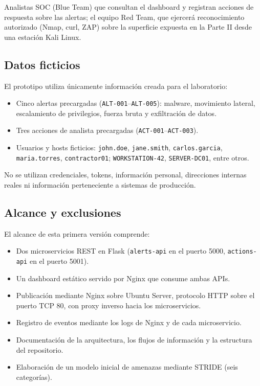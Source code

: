 \documentclass[journal]{IEEEtran}
\begin{document}
Analistas SOC (Blue Team) que consultan el dashboard y registran acciones de
respuesta sobre las alertas; el equipo Red Team, que ejercerá reconocimiento
autorizado (Nmap, curl, ZAP) sobre la superficie expuesta en la Parte II desde
una estación Kali Linux.

\subsection{Datos ficticios}

El prototipo utiliza únicamente información creada para el laboratorio:

\begin{itemize}
    \item Cinco alertas precargadas (\texttt{ALT-001}--\texttt{ALT-005}):
    malware, movimiento lateral, escalamiento de privilegios, fuerza bruta y
    exfiltración de datos.
    \item Tres acciones de analista precargadas (\texttt{ACT-001}--\texttt{ACT-003}).
    \item Usuarios y hosts ficticios: \texttt{john.doe}, \texttt{jane.smith},
    \texttt{carlos.garcia}, \texttt{maria.torres}, \texttt{contractor01};
    \texttt{WORKSTATION-42}, \texttt{SERVER-DC01}, entre otros.
\end{itemize}

No se utilizan credenciales, tokens, información personal, direcciones
internas reales ni información perteneciente a sistemas de producción.

\subsection{Alcance y exclusiones}

El alcance de esta primera versión comprende:

\begin{itemize}
    \item Dos microservicios REST en Flask (\texttt{alerts-api} en el puerto
    5000, \texttt{actions-api} en el puerto 5001).
    \item Un dashboard estático servido por Nginx que consume ambas APIs.
    \item Publicación mediante Nginx sobre Ubuntu Server, protocolo HTTP sobre
    el puerto TCP 80, con proxy inverso hacia los microservicios.
    \item Registro de eventos mediante los logs de Nginx y de cada
    microservicio.
    \item Documentación de la arquitectura, los flujos de información y la
    estructura del repositorio.
    \item Elaboración de un modelo inicial de amenazas mediante STRIDE (seis
    categorías).
\end{itemize}
\end{document}
